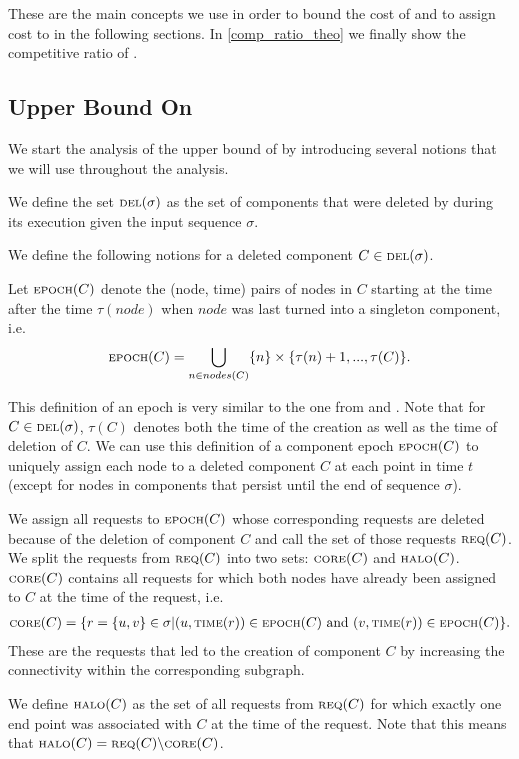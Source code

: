 \documentclass[a4paper, 10pt]{article}
\newcommand{\crep}{\text{C{\scriptsize REP}}}
\newcommand{\del}{\text{\scriptsize DEL}}
\newcommand{\opt}{\text{O{\scriptsize PT}}}
\newcommand{\core}{\text{\scriptsize CORE}}
\newcommand{\halo}{\text{\scriptsize HALO}}
\newcommand{\req}{\text{\scriptsize REQ}}
\newcommand{\epoch}{\text{\scriptsize EPOCH}}
\newcommand{\reqTime}{\text{\scriptsize TIME}}
\newcommand{\adjDel}{\text{C{\scriptsize REP}-A{\scriptsize DJ}}}
\theoremstyle{definition}
\begin{document}
These are the main concepts we use in order to bound the cost of \adjDel{} and to assign cost to \opt{} in the following sections. In \cref{comp_ratio_theo} we finally show the competitive ratio of \adjDel{} .


\subsection{Upper Bound On \adjDel{}}

We start the analysis of the upper bound of \crep{} by introducing several notions that we will use throughout the analysis.

We define the set $\del(\sigma)$ as the set of components that were deleted by \crep{} during its execution given the input sequence $\sigma$.

We define the following notions for a deleted component $C\in\del{}(\sigma)$.

Let $\epoch{}(C)$ denote the (node, time) pairs of nodes in $C$ starting at the time after the time $\tau(node)$ when $node$ was last turned into a singleton component, i.e. 
\begin{align*}
	\epoch{}(C)=\bigcup_{n\in nodes(C)}\{n\}\times\{\tau(n)+1,...,\tau(C)\}.
\end{align*}

This definition of an epoch is very similar to the one from \cite{Avin2016} and \cite{Avin2015}.
Note that for $C\in\del(\sigma)$, $\tau(C)$ denotes both the time of the creation as well as the time of deletion of $C$. We can use this definition of a component epoch $\epoch(C)$ to uniquely assign each node to a deleted component $C$ at each point in time $t$ (except for nodes in components that persist until the end of sequence $\sigma$).

We assign all requests to $\epoch(C)$ whose corresponding requests are deleted because of the deletion of component $C$ and call the set of those requests $\req(C)$.
We split the requests from $\req{}(C)$ into two sets: $\core(C)$ and $\halo(C)$. $\core(C)$ contains all requests for which both nodes have already been assigned to $C$ at the time of the request, i.e. 
\begin{align*}
\core(C)=\{r=\{u,v\}\in\sigma| (u,\reqTime(r))\in \epoch(C)\text{ and } (v, \reqTime(r))\in \epoch(C)\}.
\end{align*}
These are the requests that led to the creation of component $C$ by increasing the connectivity within the corresponding subgraph.
 
We define $\halo(C)$ as the set of all requests from $\req(C)$ for which exactly one end point was associated with $C$ at the time of the request. Note that this means that $\halo(C)=\req(C)\backslash \core(C)$.
\end{document}
